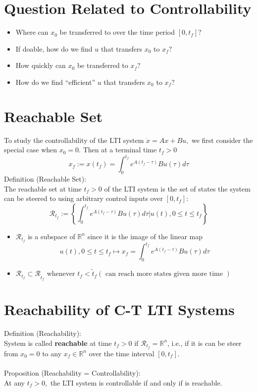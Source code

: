 \documentclass[10pt,a4paper,oneside]{article}
\begin{document}
\section{Question Related to Controllability}
\begin{itemize}
\item Where can $x_{0}$ be transferred to over the time period $\left[0, t_{f}\right] ?$
\item If doable, how do we find $u$ that transfers $x_{0}$ to $x_{f} ?$
\item How quickly can $x_{0}$ be transferred to $x_{f} ?$
\item How do we find ``efficient'' $u$ that transfers $x_{0}$ to $x_{f} ?$
\end{itemize}
\section{Reachable Set}
To study the controllability of the LTI system $\dot{x}=A x+B u,$ we first consider the special case when $x_{0}=0 .$ Then at a terminal time $t_{f}>0$
\[
x_{f} :=x\left(t_{f}\right)=\int_{0}^{t_{f}} e^{A\left(t_{f}-\tau\right)} B u(\tau) d \tau
\]
Definition (Reachable Set):\\
The reachable set at time $t_{f}>0$ of the LTI system is the set of states
the system can be steered to using arbitrary control inputs over $\left[0, t_{f}\right]$:
\[
\mathcal{R}_{t_{f}} :=\left\{\int_{0}^{t_{f}} e^{A\left(t_{f}-\tau\right)} B u(\tau) d \tau | u(t), 0 \leq t \leq t_{f}\right\}
\]
\begin{itemize}
\item $\mathcal{R}_{t_f}$ is a subspace of $\mathbb{R}^{n}$ since it is the image of the linear map
\[
u(t), 0 \leq t \leq t_{f} \mapsto x_{f}=\int_{0}^{t_{f}} e^{A\left(t_{f}-\tau\right)} B u(\tau) d \tau
\]
\item $\mathcal{R}_{t_{f}} \subset \mathcal{R}_{\tilde{t}_{f}}$ whenever $t_{f}<\tilde{t}_{f}(\text { can reach more states given more time })$
\end{itemize}
\section{Reachability of C-T LTI Systems}
Definition (Reachability):\\
System is called {\bfseries reachable} at time $t_f>0$ if $\mathcal{R}_{t_{f}}=\mathbb{R}^{n}$, i.e., if it is can be steer from $x_0=0$ to any $x_f\in\mathbb{R}^n$ over the time interval $[0, t_f]$.\\
\\
Proposition (Reachability = Controllability):\\
At any $t_{f}>0,$ the LTI system is controllable if and only if is reachable.
\end{document}
